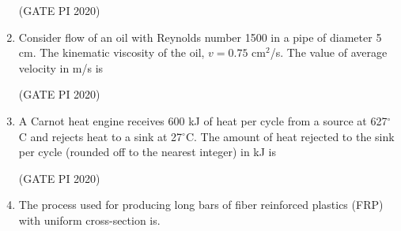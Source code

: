 \documentclass[journal,12pt,onecolumn]{IEEEtran}
\theoremstyle{remark}
\begin{document}
\begin{enumerate}
\begin{enumerate}
\end{enumerate}

\hfill (GATE PI 2020)

\item Consider flow of an oil with Reynolds number 1500 in a pipe of diameter 5 cm. The kinematic viscosity of the oil, $v = 0.75$ cm$^2$/s. The value of average velocity in m/s is

\begin{enumerate}
\end{enumerate}

\hfill (GATE PI 2020)

\item A Carnot heat engine receives 600 kJ of heat per cycle from a source at 627$^\circ$C and rejects heat to a sink at 27$^\circ$C. The amount of heat rejected to the sink per cycle (rounded off to the nearest integer) in kJ is 

\begin{enumerate}
\end{enumerate}

\hfill (GATE PI 2020)

\item The process used for producing long bars of fiber reinforced plastics (FRP) with uniform cross-section is.

\begin{enumerate}
\end{enumerate}


\end{enumerate}
\end{document}
